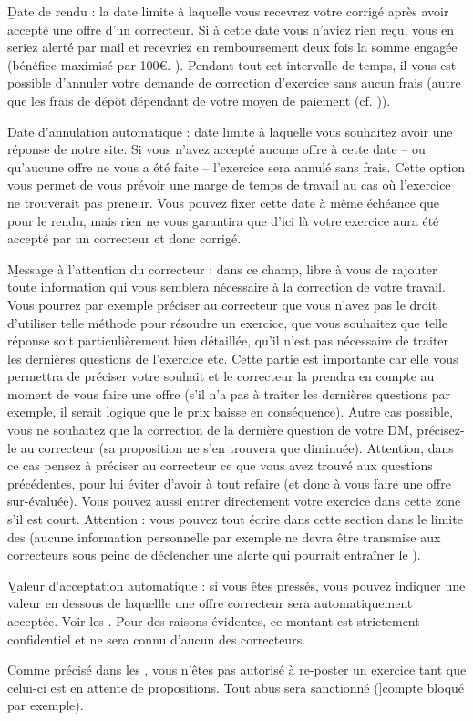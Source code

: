 \item \b{Date de rendu} : la date limite à laquelle vous recevrez votre corrigé après avoir accepté une offre d'un correcteur. Si à cette date vous n'aviez rien reçu, vous en seriez alerté par mail et recevriez en remboursement deux fois la somme engagée (bénéfice maximisé par 100€. ). Pendant tout cet intervalle de temps, il vous est possible d'annuler votre demande de correction d'exercice sans aucun frais (autre que les frais de dépôt dépendant de votre moyen de paiement (cf. )).
\item \b{Date d'annulation automatique} : date limite à laquelle vous souhaitez avoir une réponse de notre site. Si vous n'avez accepté aucune offre à cette date -- ou qu'aucune offre ne vous a été faite -- l'exercice sera annulé sans frais. Cette option vous permet de vous prévoir une marge de temps de travail au cas où l'exercice ne trouverait pas preneur. Vous pouvez fixer cette date à même échéance que pour le rendu, mais rien ne vous garantira que d'ici là votre exercice aura été accepté par un correcteur et donc corrigé.
\item \b{Message à l'attention du correcteur} : dans ce champ, libre à vous de rajouter toute information qui vous semblera nécessaire à la correction de votre travail. Vous pourrez par exemple préciser au correcteur que vous n'avez pas le droit d'utiliser telle méthode pour résoudre un exercice, que vous souhaitez que telle réponse soit particulièrement bien détaillée, qu'il n'est pas nécessaire de traiter les dernières questions de l'exercice etc. Cette partie est importante car elle vous permettra de préciser votre souhait et le correcteur la prendra en compte au moment de vous faire une offre (s'il n'a pas à traiter les dernières questions par exemple, il serait logique que le prix baisse en conséquence). Autre cas possible, vous ne souhaitez que la correction de la dernière question de votre DM, précisez-le au correcteur (sa proposition ne s'en trouvera que diminuée). Attention, dans ce cas pensez à préciser au correcteur ce que vous avez trouvé aux questions précédentes, pour lui éviter d'avoir à tout refaire (et donc à vous faire une offre sur-évaluée).
Vous pouvez aussi entrer directement votre exercice dans cette zone s'il est court. Attention : vous pouvez tout écrire dans cette section dans le limite des  (aucune information personnelle par exemple ne devra être transmise aux correcteurs sous peine de déclencher une alerte qui pourrait entraîner le ).
\item \b{Valeur d'acceptation automatique} : si vous êtes pressés, vous pouvez indiquer une valeur en dessous de laquellle une offre correcteur sera automatiquement acceptée. Voir les . Pour des raisons évidentes, ce montant est strictement confidentiel et ne sera connu d'aucun des correcteurs.

Comme précisé dans les , vous n'êtes pas autorisé à re-poster un exercice tant que celui-ci est en attente de propositions. Tout abus sera sanctionné (]{compte bloqué} par exemple).